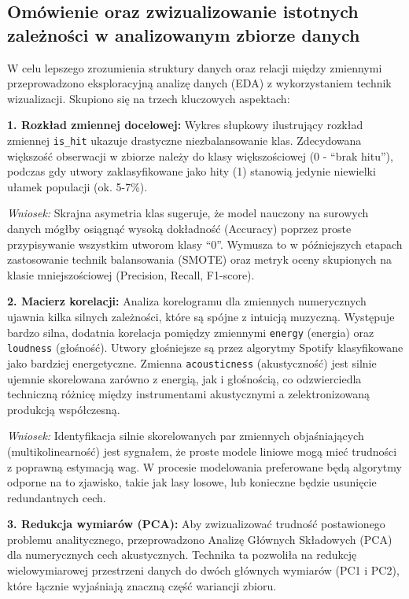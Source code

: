\documentclass[
]{article}
\begin{document}
\subsection{Omówienie oraz zwizualizowanie istotnych zależności w
analizowanym zbiorze
danych}\label{omuxf3wienie-oraz-zwizualizowanie-istotnych-zaleux17cnoux15bci-w-analizowanym-zbiorze-danych}

W celu lepszego zrozumienia struktury danych oraz relacji między
zmiennymi przeprowadzono eksploracyjną analizę danych (EDA) z
wykorzystaniem technik wizualizacji. Skupiono się na trzech kluczowych
aspektach:

\textbf{1. Rozkład zmiennej docelowej:} Wykres słupkowy ilustrujący
rozkład zmiennej \texttt{is\_hit} ukazuje drastyczne niezbalansowanie
klas. Zdecydowana większość obserwacji w zbiorze należy do klasy
większościowej (0 - ``brak hitu''), podczas gdy utwory zaklasyfikowane
jako hity (1) stanowią jedynie niewielki ułamek populacji (ok. 5-7\%).

\emph{Wniosek:} Skrajna asymetria klas sugeruje, że model nauczony na
surowych danych mógłby osiągnąć wysoką dokładność (Accuracy) poprzez
proste przypisywanie wszystkim utworom klasy ``0''. Wymusza to w
późniejszych etapach zastosowanie technik balansowania (SMOTE) oraz
metryk oceny skupionych na klasie mniejszościowej (Precision, Recall,
F1-score).

\textbf{2. Macierz korelacji:} Analiza korelogramu dla zmiennych
numerycznych ujawnia kilka silnych zależności, które są spójne z
intuicją muzyczną. Występuje bardzo silna, dodatnia korelacja pomiędzy
zmiennymi \texttt{energy} (energia) oraz \texttt{loudness} (głośność).
Utwory głośniejsze są przez algorytmy Spotify klasyfikowane jako
bardziej energetyczne. Zmienna \texttt{acousticness} (akustyczność) jest
silnie ujemnie skorelowana zarówno z energią, jak i głośnością, co
odzwierciedla techniczną różnicę między instrumentami akustycznymi a
zelektronizowaną produkcją współczesną.

\emph{Wniosek:} Identyfikacja silnie skorelowanych par zmiennych
objaśniających (multikolinearność) jest sygnałem, że proste modele
liniowe mogą mieć trudności z poprawną estymacją wag. W procesie
modelowania preferowane będą algorytmy odporne na to zjawisko, takie jak
lasy losowe, lub konieczne będzie usunięcie redundantnych cech.

\textbf{3. Redukcja wymiarów (PCA):} Aby zwizualizować trudność
postawionego problemu analitycznego, przeprowadzono Analizę Głównych
Składowych (PCA) dla numerycznych cech akustycznych. Technika ta
pozwoliła na redukcję wielowymiarowej przestrzeni danych do dwóch
głównych wymiarów (PC1 i PC2), które łącznie wyjaśniają znaczną część
wariancji zbioru.
\end{document}
